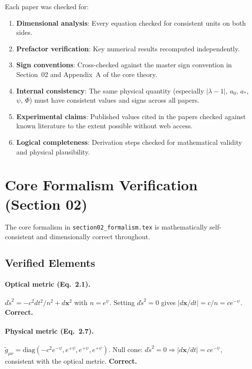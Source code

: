 \documentclass[12pt,a4paper]{article}
\begin{document}
Each paper was checked for:
\begin{enumerate}[nosep]
\item \textbf{Dimensional analysis}: Every equation checked for consistent
units on both sides.
\item \textbf{Prefactor verification}: Key numerical results recomputed
independently.
\item \textbf{Sign conventions}: Cross-checked against the master sign
convention in Section~02 and Appendix~A of the core theory.
\item \textbf{Internal consistency}: The same physical quantity (especially
$|\lambda-1|$, $a_0$, $a_*$, $\psi$, $\Phi$) must have consistent values
and signs across all papers.
\item \textbf{Experimental claims}: Published values cited in the papers
checked against known literature to the extent possible without web access.
\item \textbf{Logical completeness}: Derivation steps checked for
mathematical validity and physical plausibility.
\end{enumerate}

\section{Core Formalism Verification (Section 02)}
\label{sec:core}

\begin{verified}
The core formalism in \texttt{section02\_formalism.tex} is mathematically
self-consistent and dimensionally correct throughout.
\end{verified}

\subsection{Verified Elements}

\paragraph{Optical metric (Eq.~2.1).}
$d\tilde{s}^2 = -c^2 dt^2/n^2 + d\mathbf{x}^2$ with $n = e^\psi$.
Setting $d\tilde{s}^2 = 0$ gives $|d\mathbf{x}/dt| = c/n = ce^{-\psi}$.
\textbf{Correct.}

\paragraph{Physical metric (Eq.~2.7).}
$\tilde{g}_{\mu\nu} = \text{diag}(-c^2 e^{-\psi}, e^{+\psi}, e^{+\psi}, e^{+\psi})$.
Null cone: $d\tilde{s}^2 = 0 \Rightarrow |d\mathbf{x}/dt| = ce^{-\psi}$,
consistent with the optical metric. \textbf{Correct.}
\end{document}
